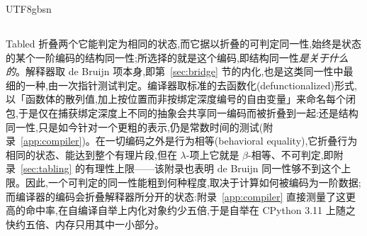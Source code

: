 \begin{CJK*}{UTF8}{gbsn}
  \subsection{}\label{sec:design-space}
  \ifTablambdaChinese
  \textsf{Tabled} 折叠两个它能判定为相同的状态,而它据以折叠的可判定同一性,始终是状态的某个一阶编码的结构同一性;所选择的就是这个编码,即结构同一性\emph{是关于什么的}。解释器取 de Bruijn 项本身,即第~\ref{sec:bridge} 节的内化,也是这类同一性中最细的一种,由一次指针测试判定。编译器取标准的去函数化(defunctionalized)形式,以「函数体的散列值,加上按位置而非按绑定深度编号的自由变量」来命名每个闭包,于是仅在捕获绑定深度上不同的抽象会共享同一编码而被折叠到一起:还是结构同一性,只是如今针对一个更粗的表示,仍是常数时间的测试(附录~\ref{app:compiler})。在一切编码之外是行为相等(behavioral equality),它折叠行为相同的状态、能达到整个有理片段,但在 $\lambda$-项上它就是 $\beta$-相等、不可判定,即附录~\ref{sec:tabling} 的有理性上限——该附录也表明 de Bruijn 同一性够不到这个上限。因此,一个可判定的同一性能粗到何种程度,取决于计算如何被编码为一阶数据;而编译器的编码会折叠解释器所分开的状态:附录~\ref{app:compiler} 直接测量了这更高的命中率,在自编译自举上内化对象约少五倍,于是自举在 CPython 3.11 上随之快约五倍、内存只用其中一小部分。


\end{CJK*}

